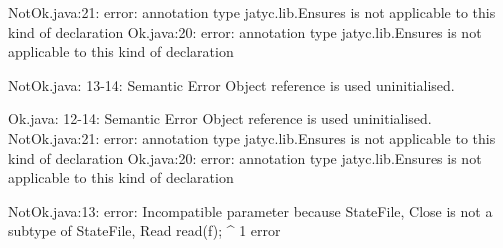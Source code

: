 \lstset{language=,caption=Mungo's output}
\begin{code}
NotOk.java:21: error: annotation type jatyc.lib.Ensures is not applicable to this kind of declaration
Ok.java:20: error: annotation type jatyc.lib.Ensures is not applicable to this kind of declaration

NotOk.java: 13-14: Semantic Error
		Object reference is used uninitialised.

Ok.java: 12-14: Semantic Error
		Object reference is used uninitialised.
NotOk.java:21: error: annotation type jatyc.lib.Ensures is not applicable to this kind of declaration
Ok.java:20: error: annotation type jatyc.lib.Ensures is not applicable to this kind of declaration
\end{code}

\lstset{language=,caption=Our tool's output}
\begin{code}
NotOk.java:13: error: Incompatible parameter because State{File, Close} is not a subtype of State{File, Read}
        read(f);
             ^
1 error
\end{code}


